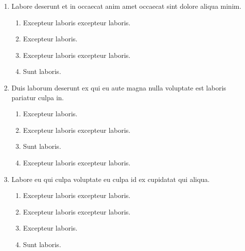 \documentclass[a4paper,12pt]{article}
\begin{document}
\begin{enumerate}[label=\textbf{\arabic*.}]
\begin{multicols}{2}
\begin{enumerate}
	\end{enumerate}

\end{multicols}
\item Labore deserunt et in occaecat anim amet occaecat sint dolore aliqua minim.
\begin{multicols}{2}
	\begin{enumerate}
		\item  Excepteur laboris excepteur laboris.
    
		\item  Excepteur laboris.
    
		\item  Excepteur laboris excepteur laboris.
  
		\item  Sunt laboris.
    
	\end{enumerate}

\end{multicols}
\item Duis laborum deserunt ex qui eu aute magna nulla voluptate est laboris pariatur culpa in.
\begin{multicols}{2}
	\begin{enumerate}
		\item  Excepteur laboris.
    
		\item  Excepteur laboris excepteur laboris.
  
		\item  Sunt laboris.
    
		\item  Excepteur laboris excepteur laboris.
    
	\end{enumerate}

\end{multicols}
\item Labore eu qui culpa voluptate eu culpa id ex cupidatat qui aliqua.
\begin{multicols}{2}
	\begin{enumerate}
		\item  Excepteur laboris excepteur laboris.
  
		\item  Excepteur laboris excepteur laboris.
    
		\item  Excepteur laboris.
    
		\item  Sunt laboris.
    

\end{enumerate}
\end{multicols}
\end{enumerate}
\end{document}
